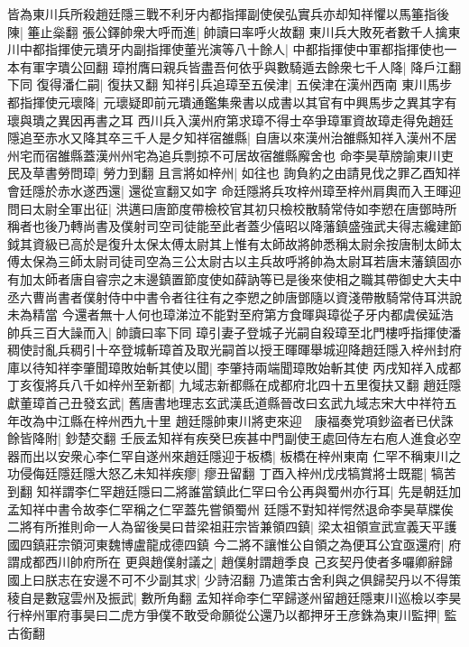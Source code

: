 皆為東川兵所殺趙廷隱三戰不利牙内都指揮副使侯弘實兵亦却知祥懼以馬箠指後陳|{
	箠止橤翻}
張公鐸帥衆大呼而進|{
	帥讀曰率呼火故翻}
東川兵大敗死者數千人擒東川中都指揮使元璝牙内副指揮使董光演等八十餘人|{
	中都指揮使中軍都指揮使也一本有軍字璝公回翻}
璋拊膺曰親兵皆盡吾何依乎與數騎遁去餘衆七千人降|{
	降戶江翻下同}
復得潘仁嗣|{
	復扶又翻}
知祥引兵追璋至五侯津|{
	五侯津在漢州西南}
東川馬步都指揮使元瓌降|{
	元瓌疑即前元璝通鑑集衆書以成書以其官有中興馬步之異其字有瓌與璝之異因再書之耳}
西川兵入漢州府第求璋不得士卒爭璋軍資故璋走得免趙廷隱追至赤水又降其卒三千人是夕知祥宿雒縣|{
	自唐以來漢州治雒縣知祥入漢州不居州宅而宿雒縣蓋漢州州宅為追兵剽掠不可居故宿雒縣廨舍也}
命李昊草牓諭東川吏民及草書勞問璋|{
	勞力到翻}
且言將如梓州|{
	如往也}
詢負約之由請見伐之罪乙酉知祥會廷隱於赤水遂西還|{
	還從宣翻又如字}
命廷隱將兵攻梓州璋至梓州肩輿而入王暉迎問曰太尉全軍出征|{
	洪邁曰唐節度帶檢校官其初只檢校散騎常侍如李愬在唐鄧時所稱者也後乃轉尚書及僕射司空司徒能至此者蓋少僖昭以降藩鎮盛強武夫得志纔建節鉞其資級已高於是復升太保太傅太尉其上惟有太師故將帥悉稱太尉余按唐制太師太傅太保為三師太尉司徒司空為三公太尉古以主兵故呼將帥為太尉耳若唐末藩鎮固亦有加太師者唐自睿宗之末邊鎮置節度使如薛訥等已是後來使相之職其帶御史大夫中丞六曹尚書者僕射侍中中書令者往往有之李愬之帥唐鄧隨以資淺帶散騎常侍耳洪說未為精當}
今還者無十人何也璋涕泣不能對至府第方食暉與璋從子牙内都虞侯延浩帥兵三百大譟而入|{
	帥讀曰率下同}
璋引妻子登城子光嗣自殺璋至北門樓呼指揮使潘稠使討亂兵稠引十卒登城斬璋首及取光嗣首以授王暉暉舉城迎降趙廷隱入梓州封府庫以待知祥李肇聞璋敗始斬其使以聞|{
	李肇持兩端聞璋敗始斬其使}
丙戌知祥入成都丁亥復將兵八千如梓州至新都|{
	九域志新都縣在成都府北四十五里復扶又翻}
趙廷隱獻董璋首己丑發玄武|{
	舊唐書地理志玄武漢氐道縣晉改曰玄武九域志宋大中祥符五年改為中江縣在梓州西九十里}
趙廷隱帥東川將吏來迎　康福奏党項鈔盜者已伏誅餘皆降附|{
	鈔楚交翻}
壬辰孟知祥有疾癸巳疾甚中門副使王處回侍左右庖人進食必空器而出以安衆心李仁罕自遂州來趙廷隱迎于板橋|{
	板橋在梓州東南}
仁罕不稱東川之功侵侮廷隱廷隱大怒乙未知祥疾瘳|{
	瘳丑留翻}
丁酉入梓州戊戌犒賞將士既罷|{
	犒苦到翻}
知祥謂李仁罕趙廷隱曰二將誰當鎮此仁罕曰令公再與蜀州亦行耳|{
	先是朝廷加孟知祥中書令故李仁罕稱之仁罕蓋先嘗領蜀州}
廷隱不對知祥愕然退命李昊草牒俟二將有所推則命一人為留後昊曰昔梁祖莊宗皆兼領四鎮|{
	梁太祖領宣武宣義天平護國四鎮莊宗領河東魏博盧龍成德四鎮}
今二將不讓惟公自領之為便耳公宜亟還府|{
	府謂成都西川帥府所在}
更與趙僕射議之|{
	趙僕射謂趙季良}
己亥契丹使者多囉卿辭歸國上曰朕志在安邊不可不少副其求|{
	少詩沼翻}
乃遣策古舍利與之俱歸契丹以不得策稜自是數寇雲州及振武|{
	數所角翻}
孟知祥命李仁罕歸遂州留趙廷隱東川巡檢以李昊行梓州軍府事昊曰二虎方爭僕不敢受命願從公還乃以都押牙王彦銖為東川監押|{
	監古銜翻}
